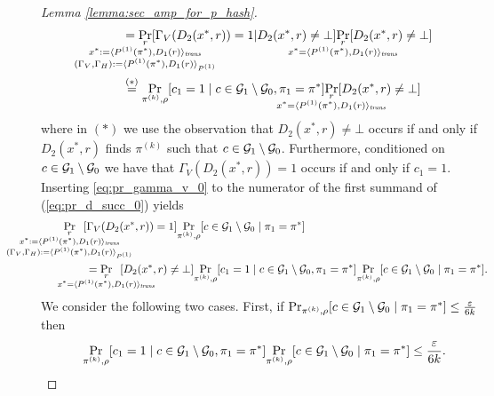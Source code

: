 \begin{proof}[Lemma \ref{lemma:sec_amp_for_p_hash}]
\begin{align}
  &\IndI = \underset{
    \mathclap{
      \substack{r \\
        x^* := \langle P^{(1)}(\pi^*), D_1 (r) \rangle_{\mathit{trans}} \\
        (\Gamma_V, \Gamma_H) := \langle P^{(1)}(\pi^*), D_1(r) \rangle_{P^{(1)}} }}}
  {\Pr}[\Gamma_V(D_2(x^*, r)) = 1 | D_2(x^*,r) \neq \bot]
  \underset{\mathclap{\substack{r \\ x^* = \langle P^{(1)}(\pi^*), D_1(r) \rangle_{\mathit{trans}}}}}{\Pr}[D_2(x^*,r) \neq \bot] \notag\\
  &\IndI \stackrel{(*)}{=}
  \underset{\pi^{(k)}, \rho}{\Pr}[c_1 = 1 \mid c \in \cG_1 \setminus \cG_0, \pi_1 = \pi^*]
  \underset{\mathclap{\substack{r \\ x^* = \langle P^{(1)}(\pi^*), D_1(r) \rangle_{\mathit{trans}}}}} {\Pr}[D_2(x^*,r) \neq \bot]
\end{align}
where in $(*)$ we use the observation that $D_2(x^*, r) \neq \bot$ occurs if and only if $D_2(x^*, r)$ finds $\pi^{(k)}$ such that $c \in \mathcal{G}_1 \setminus \mathcal{G}_0$.
Furthermore, conditioned on $c \in \mathcal{G}_1 \setminus \mathcal{G}_0$ we have that $\Gamma_V(D_2(x^*,r)) = 1$ occurs if and only if $c_1 = 1$.
Inserting \eqref{eq:pr_gamma_v_0} to the numerator of the first summand of (\ref{eq:pr_d_succ_0}) yields
\begin{align}
\IndI &\underset{
  \mathclap{
  \substack{r \\
    x^* := \langle P^{(1)}(\pi^*), D_1 (r) \rangle_{\mathit{trans}} \\
    (\Gamma_V, \Gamma_H) := \langle P^{(1)}(\pi^*), D_1(r) \rangle_{P^{(1)}} }}}
{\Pr}\mkern13mu[\Gamma_V(D_2(x^*, r)) = 1]
\underset{\pi^{(k)},\rho}{\Pr}[c \in \cG_1 \setminus \cG_0 \mid \pi_1 = \pi^*] \notag\\
  &\IndI = \underset{\mathclap{\substack{r
      \\ x^* = \langle P^{(1)}(\pi^*), D_1(r) \rangle_{\mathit{trans}}}}}
  {\Pr}\mkern13mu[D_2(x^*,r) \neq \bot]
  \underset{\pi^{(k)}, \rho}{\Pr}[c_1 = 1 \mid c \in \cG_1 \setminus \cG_0, \pi_1 = \pi^*]
  \underset{\pi^{(k)}, \rho}{\Pr}[c \in \cG_1 \setminus \cG_0 \mid \pi_1 = \pi^*].
\end{align}
We consider the following two cases. First, if $\Pr_{\pi^{(k)}, \rho}[ c \in \mathcal{G}_1 \setminus \mathcal{G}_0 \mid \pi_1 = \pi^*] \leq \frac{\varepsilon}{6k}$ then
\begin{align}
  \label{ineq:case_0}
  \underset{\pi^{(k)}, \rho}{\Pr}[c_1 = 1 \mid c \in \cG_1 \setminus \cG_0, \pi_1 = \pi^*] \underset{\pi^{(k)}, \rho}{\Pr}[c \in \cG_1 \setminus \cG_0 \mid \pi_1 = \pi^*] \leq \frac{\epsilon}{6k}.

\end{align}
\end{proof}
